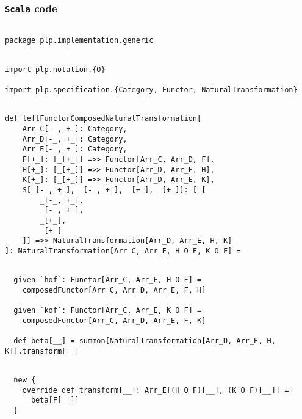 \documentclass[11pt]{article}
\newcommand{\code}{\subsubsection{{\tt Scala} code}\begingroup\rm \vspace{12pt}}
\def\edefn{\endgroup\par\pagebreak[2]\addvspace{\medskipamount}}
\let\ecode=\edefn
\begin{document}
\code
\begin{mdframed}[backgroundcolor=lightgray!20] 
\begin{lstlisting}

package plp.implementation.generic
\end{lstlisting}
\end{mdframed}
\vspace{6pt}
\begin{mdframed}[backgroundcolor=lightgray!20] 
\begin{lstlisting}

import plp.notation.{O}

import plp.specification.{Category, Functor, NaturalTransformation}
\end{lstlisting}
\end{mdframed}
\vspace{6pt}
\begin{mdframed}[backgroundcolor=lightgray!20] 
\begin{lstlisting}

def leftFunctorComposedNaturalTransformation[
    Arr_C[-_, +_]: Category,
    Arr_D[-_, +_]: Category,
    Arr_E[-_, +_]: Category,
    F[+_]: [_[+_]] =>> Functor[Arr_C, Arr_D, F],
    H[+_]: [_[+_]] =>> Functor[Arr_D, Arr_E, H],
    K[+_]: [_[+_]] =>> Functor[Arr_D, Arr_E, K],
    S[_[-_, +_], _[-_, +_], _[+_], _[+_]]: [_[
        _[-_, +_],
        _[-_, +_],
        _[+_],
        _[+_]
    ]] =>> NaturalTransformation[Arr_D, Arr_E, H, K]
]: NaturalTransformation[Arr_C, Arr_E, H O F, K O F] =
\end{lstlisting}
\end{mdframed}
\vspace{6pt}
\begin{mdframed}[backgroundcolor=lightgray!20] 
\begin{lstlisting}

  given `hof`: Functor[Arr_C, Arr_E, H O F] =
    composedFunctor[Arr_C, Arr_D, Arr_E, F, H]

  given `kof`: Functor[Arr_C, Arr_E, K O F] =
    composedFunctor[Arr_C, Arr_D, Arr_E, F, K]

  def beta[__] = summon[NaturalTransformation[Arr_D, Arr_E, H, K]].transform[__]
\end{lstlisting}
\end{mdframed}
\vspace{6pt}
\clearpage
\begin{mdframed}[backgroundcolor=lightgray!20] 
\begin{lstlisting}

  new {
    override def transform[__]: Arr_E[(H O F)[__], (K O F)[__]] =
      beta[F[__]]
  }
\end{lstlisting}
\end{mdframed}
\ecode  
\end{document}
